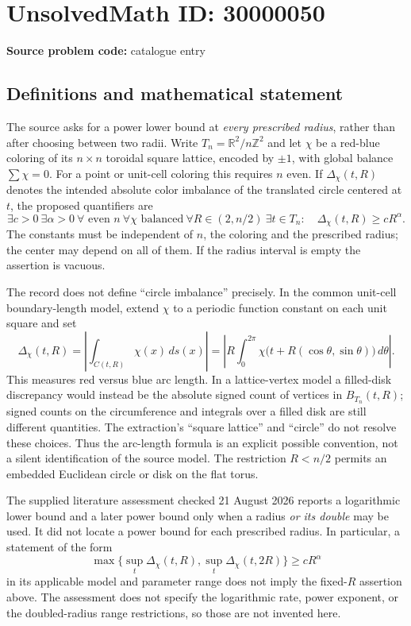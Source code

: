 \documentclass[11pt]{article}
\newcommand{\Z}{\mathbb{Z}}
\newcommand{\R}{\mathbb{R}}
\begin{document}
\section*{UnsolvedMath ID: 30000050}
\textbf{Source problem code:} catalogue entry
\subsection{Definitions and mathematical statement}
The source asks for a power lower bound at \emph{every prescribed radius}, rather than after choosing between two radii. Write $T_n=\R^2/n\Z^2$ and let $\chi$ be a red-blue coloring of its $n\times n$ toroidal square lattice, encoded by $\pm1$, with global balance $\sum\chi=0$. For a point or unit-cell coloring this requires $n$ even. If $\Delta_\chi(t,R)$ denotes the intended absolute color imbalance of the translated circle centered at $t$, the proposed quantifiers are
\[
 \exists c>0\ \exists\alpha>0\ \forall\text{ even }n\ 
 \forall\chi\text{ balanced}\ \forall R\in(2,n/2)\ 
 \exists t\in T_n:\quad \Delta_\chi(t,R)\geq cR^\alpha.
\]
The constants must be independent of $n$, the coloring and the prescribed radius; the center may depend on all of them. If the radius interval is empty the assertion is vacuous.

The record does not define ``circle imbalance'' precisely. In the common unit-cell boundary-length model, extend $\chi$ to a periodic function constant on each unit square and set
\[
 \Delta_\chi(t,R)=\left|\int_{C(t,R)}\chi(x)\,ds(x)\right|
 =\left|R\int_0^{2\pi}\chi\bigl(t+R(\cos\theta,\sin\theta)\bigr)\,d\theta\right|.
\]
This measures red versus blue arc length. In a lattice-vertex model a filled-disk discrepancy would instead be the absolute signed count of vertices in $B_{T_n}(t,R)$; signed counts on the circumference and integrals over a filled disk are still different quantities. The extraction's ``square lattice'' and ``circle'' do not resolve these choices. Thus the arc-length formula is an explicit possible convention, not a silent identification of the source model. The restriction $R<n/2$ permits an embedded Euclidean circle or disk on the flat torus.

The supplied literature assessment checked 21 August 2026 reports a logarithmic lower bound and a later power bound only when a radius \emph{or its double} may be used. It did not locate a power bound for each prescribed radius. In particular, a statement of the form
\[
 \max\{\sup_t\Delta_\chi(t,R),\sup_t\Delta_\chi(t,2R)\}
 \geq cR^\alpha
\]
in its applicable model and parameter range does not imply the fixed-$R$ assertion above. The assessment does not specify the logarithmic rate, power exponent, or the doubled-radius range restrictions, so those are not invented here.
\end{document}
